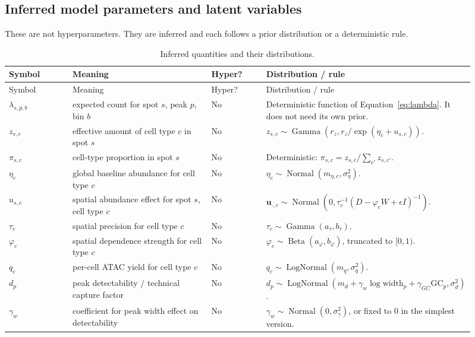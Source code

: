 \documentclass[11pt]{article}
\newcommand{\Gam}{\operatorname{Gamma}}
\newcommand{\Betadist}{\operatorname{Beta}}
\newcommand{\LogNormal}{\operatorname{LogNormal}}
\newcommand{\Normal}{\operatorname{Normal}}
\begin{document}
\subsection{Inferred model parameters and latent variables}

These are not hyperparameters.  They are inferred and each follows a prior distribution or a deterministic rule.

\begin{longtable}{L{0.14\linewidth}L{0.31\linewidth}C{0.12\linewidth}L{0.34\linewidth}}
\caption{Inferred quantities and their distributions.}\label{tab:parameters}\\
\toprule
Symbol & Meaning & Hyper? & Distribution / rule \\
\midrule
\endfirsthead
\toprule
Symbol & Meaning & Hyper? & Distribution / rule \\
\midrule
\endhead
\(\lambda_{s,p,b}\) & expected count for spot \(s\), peak \(p\), bin \(b\) & No & Deterministic function of Equation~\eqref{eq:lambda}. It does not need its own prior. \\
\(z_{s,c}\) & effective amount of cell type \(c\) in spot \(s\) & No & \(z_{s,c}\sim\Gam\left(r_z,r_z/\exp(\eta_c+u_{s,c})\right)\). \\
\(\pi_{s,c}\) & cell-type proportion in spot \(s\) & No & Deterministic: \(\pi_{s,c}=z_{s,c}/\sum_{c'}z_{s,c'}\). \\
\(\eta_c\) & global baseline abundance for cell type \(c\) & No & \(\eta_c\sim\Normal(m_{\eta,c},\sigma_{\eta}^{2})\). \\
\(u_{s,c}\) & spatial abundance effect for spot \(s\), cell type \(c\) & No & \(\boldsymbol{u}_{\cdot,c}\sim\Normal(0,\tau_c^{-1}(D-\varphi_c W+\epsilon I)^{-1})\). \\
\(\tau_c\) & spatial precision for cell type \(c\) & No & \(\tau_c\sim\Gam(a_{\tau},b_{\tau})\). \\
\(\varphi_c\) & spatial dependence strength for cell type \(c\) & No & \(\varphi_c\sim\Betadist(a_{\varphi},b_{\varphi})\), truncated to \([0,1)\). \\
\(q_c\) & per-cell ATAC yield for cell type \(c\) & No & \(q_c\sim\LogNormal(m_q,\sigma_q^2)\). \\
\(d_p\) & peak detectability / technical capture factor & No & \(d_p\sim\LogNormal(m_d+\gamma_w\log\mathrm{width}_p+\gamma_{GC}\mathrm{GC}_p,\sigma_d^2)\). \\
\(\gamma_w\) & coefficient for peak width effect on detectability & No & \(\gamma_w\sim\Normal(0,\sigma_{\gamma}^{2})\), or fixed to 0 in the simplest version. \\

\end{longtable}
\end{document}
